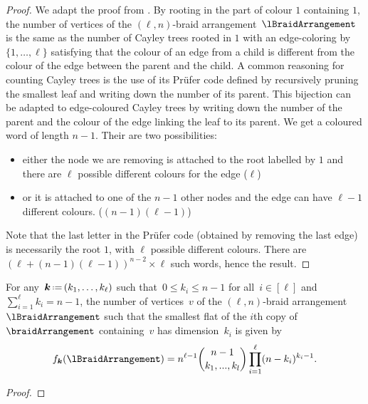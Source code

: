\begin{proof}
We adapt the proof from \cite{CKSS04}. By rooting in the part of colour $1$ containing $1$, the number of vertices of the $(\ell,n)$-braid arrangement~$\lBraidArrangement$ is the same as the number of Cayley trees rooted in $1$ with an edge-coloring by $\{1, \ldots, \ell\}$ satisfying that the colour of an edge from a child is different from the colour of the edge between the parent and the child. A common reasoning for counting Cayley trees is the use of its Prüfer code defined by recursively pruning the smallest leaf and writing down the number of its parent. This bijection can be adapted to edge-coloured Cayley trees by writing down the number of the parent and the colour of the edge linking the leaf to its parent. We get a coloured word of length $n-1$. Their are two possibilities:
\begin{itemize}
\item either the node we are removing is attached to the root labelled by $1$ and there are $\ell$ possible different colours for the edge ($\ell$)
\item or it is attached to one of the $n-1$ other nodes and the edge can have $\ell-1$ different colours. ($(n-1)(\ell-1)$)
\end{itemize}
 Note that the last letter in the Prüfer code (obtained by removing the last edge) is necessarily the root $1$, with $\ell$ possible different colours.
 There are $(\ell+(n-1)(\ell-1))^{n-2} \times \ell$ such words, hence the result.
\end{proof}

\begin{theorem}
\label{thm:verticesRefinedlnBraidArrangement}
For any~$\b{k} \eqdef (k_1, \dots, k_\ell)$ such that~$0 \le k_i \le n-1$ for all~$i \in [\ell]$ and~$\sum_{i=1}^\ell k_i = n-1$, the number of vertices~$v$ of the $(\ell,n)$-braid arrangement~$\lBraidArrangement$ such that the smallest flat of the $i$th copy of~$\braidArrangement$ containing~$v$ has dimension~$k_i$ is given by
\[
f_{\b{k}}(\lBraidArrangement) = n^{\ell-1}  \binom{n-1}{k_1, ..., k_l} \prod_{i=1}^\ell (n-k_i)^{k_i-1}.
\]
\end{theorem}

\begin{proof}
\end{proof}


